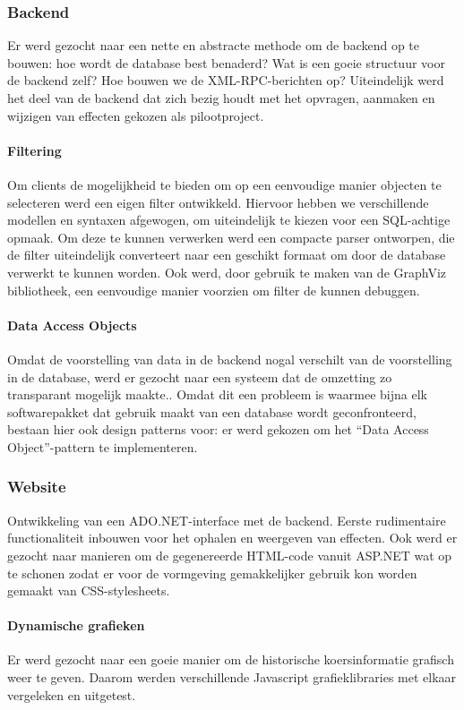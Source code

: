 \subsubsection{Backend}
Er werd gezocht naar een nette en abstracte methode om de backend op te bouwen: hoe wordt de database best benaderd? Wat is een goeie structuur voor de backend zelf? Hoe bouwen we de XML-RPC-berichten op?
Uiteindelijk werd het deel van de backend dat zich bezig houdt met het opvragen, aanmaken en wijzigen van effecten gekozen als pilootproject.

\paragraph{Filtering}
Om clients de mogelijkheid te bieden om op een eenvoudige manier objecten te selecteren werd een eigen filter ontwikkeld. Hiervoor hebben we verschillende modellen en syntaxen afgewogen, om uiteindelijk te kiezen voor een SQL-achtige opmaak. Om deze te kunnen verwerken werd een compacte parser ontworpen, die de filter uiteindelijk converteert naar een geschikt formaat om door de database verwerkt te kunnen worden.
Ook werd, door gebruik te maken van de GraphViz bibliotheek, een eenvoudige manier voorzien om filter de kunnen debuggen.

\paragraph{Data Access Objects}
Omdat de voorstelling van data in de backend nogal verschilt van de voorstelling in de database, werd er gezocht naar een systeem dat de omzetting zo transparant mogelijk maakte.. Omdat dit een probleem is waarmee bijna elk softwarepakket dat gebruik maakt van een database wordt geconfronteerd, bestaan hier ook design patterns voor: er werd gekozen om het ``Data Access Object''-pattern te implementeren.

\subsubsection{Website}
Ontwikkeling van een ADO.NET-interface met de backend. Eerste rudimentaire functionaliteit inbouwen voor het ophalen en weergeven van effecten. Ook werd er gezocht naar manieren om de gegenereerde HTML-code vanuit ASP.NET wat op te schonen zodat er voor de vormgeving gemakkelijker gebruik kon worden gemaakt van CSS-stylesheets.

\paragraph{Dynamische grafieken}
Er werd gezocht naar een goeie manier om de historische koersinformatie grafisch weer te geven. Daarom werden verschillende Javascript grafieklibraries met elkaar vergeleken en uitgetest.

